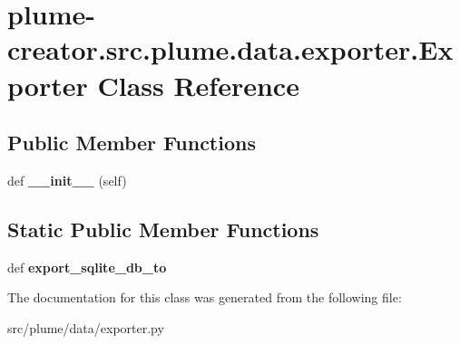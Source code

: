 \hypertarget{classplume-creator_1_1src_1_1plume_1_1data_1_1exporter_1_1_exporter}{}\section{plume-\/creator.src.\+plume.\+data.\+exporter.\+Exporter Class Reference}
\label{classplume-creator_1_1src_1_1plume_1_1data_1_1exporter_1_1_exporter}
\subsection*{Public Member Functions}
\begin{DoxyCompactItemize}
\item 
def {\bfseries \+\_\+\+\_\+init\+\_\+\+\_\+} (self)\hypertarget{classplume-creator_1_1src_1_1plume_1_1data_1_1exporter_1_1_exporter_aa0a1d9e0ca7f372d4519f97128221dc0}{}\label{classplume-creator_1_1src_1_1plume_1_1data_1_1exporter_1_1_exporter_aa0a1d9e0ca7f372d4519f97128221dc0}

\end{DoxyCompactItemize}
\subsection*{Static Public Member Functions}
\begin{DoxyCompactItemize}
\item 
def {\bfseries export\+\_\+sqlite\+\_\+db\+\_\+to}\hypertarget{classplume-creator_1_1src_1_1plume_1_1data_1_1exporter_1_1_exporter_ad3d31506e8dce174baca4214bdec7e90}{}\label{classplume-creator_1_1src_1_1plume_1_1data_1_1exporter_1_1_exporter_ad3d31506e8dce174baca4214bdec7e90}

\end{DoxyCompactItemize}


The documentation for this class was generated from the following file\+:\begin{DoxyCompactItemize}
\item 
src/plume/data/exporter.\+py\end{DoxyCompactItemize}
